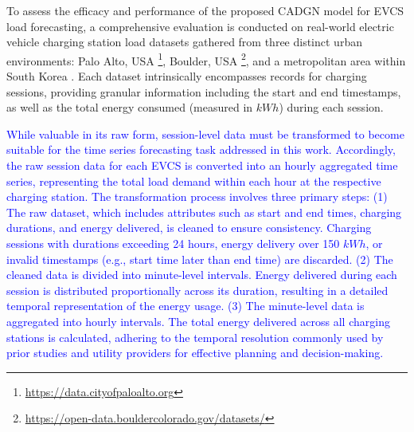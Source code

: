 \documentclass[lettersize,journal]{IEEEtran}
\newcommand{\hl}[1]{\textcolor{blue}{#1}}
\begin{document}

To assess the efficacy and performance of the proposed CADGN model for EVCS load forecasting, a comprehensive evaluation is conducted on real-world electric vehicle charging station load datasets gathered from three distinct urban environments: Palo Alto, USA \footnote{\url{https://data.cityofpaloalto.org}}, Boulder, USA \footnote{\url{https://open-data.bouldercolorado.gov/datasets/}}, and a metropolitan area within South Korea \cite{journal/scidata2024/11Keon}. Each dataset intrinsically encompasses records for charging sessions, providing granular information including the start and end timestamps, as well as the total energy consumed (measured in $kWh$) during each session. 

\hl{While valuable in its raw form, session-level data must be transformed to become suitable for the time series forecasting task addressed in this work. Accordingly, the raw session data for each EVCS is converted into an hourly aggregated time series, representing the total load demand within each hour at the respective charging station. The transformation process involves three primary steps: (1) The raw dataset, which includes attributes such as start and end times, charging durations, and energy delivered, is cleaned to ensure consistency. Charging sessions with durations exceeding 24 hours, energy delivery over 150 $kWh$, or invalid timestamps (e.g., start time later than end time) are discarded. (2) The cleaned data is divided into minute-level intervals. Energy delivered during each session is distributed proportionally across its duration, resulting in a detailed temporal representation of the energy usage. (3) The minute-level data is aggregated into hourly intervals. The total energy delivered across all charging stations is calculated, adhering to the temporal resolution commonly used by prior studies \cite{journal/tits2023/24huang, journal/tiv2023/8li, journal/tpwrs2024/Wang} and utility providers for effective planning and decision-making.}
\end{document}
